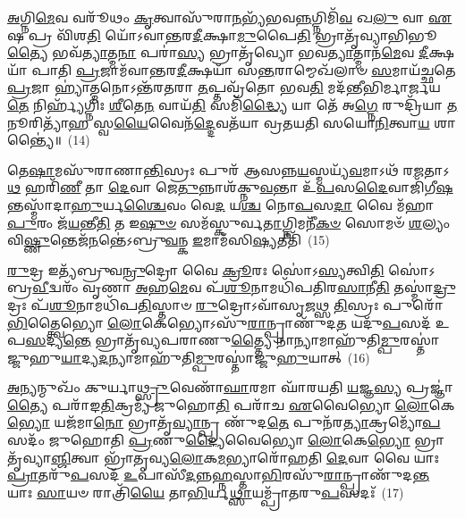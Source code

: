 \-\ul{𑌅}\-𑌗𑍍𑌨𑌿\-\ul{𑌮𑍇}\-𑌵 𑌵𑌰𑍂᳴𑌥𑌂 \ul{𑌕𑍃}\-𑌤𑍍𑌵𑌾𑌸𑍁᳴𑌰𑌾\-\ul{𑌨}\-𑌭𑍍𑌯᳴𑌭𑌵\-\ul{𑌨𑍍𑌨}\-𑌗𑍍𑌨𑌿𑌮𑌿᳴\-\ul{𑌵} 𑌖\-\ul{𑌲𑍁} 𑌵𑌾 \ul{𑌏}\-𑌷 𑌪𑍍𑌰 𑌵𑌿᳴𑌶\-\ul{𑌤𑌿} 𑌯𑍋᳴\-𑌽𑌵𑌾𑌨𑍍𑌤𑌰\-\ul{𑌦𑍀}\-𑌕𑍍𑌷𑌾\-\ul{𑌮𑍁}\-𑌪𑍈\-\ul{𑌤𑌿} 𑌭𑍍𑌰𑌾𑌤𑍃᳴𑌵𑍍𑌯𑌾𑌭𑌿𑌭𑍂\-\ul{𑌤𑍍𑌯𑍈} 𑌭𑌵᳴\-\ul{𑌤𑍍𑌯𑌾}\-𑌤𑍍𑌮\-\ul{𑌨𑌾} 𑌪𑌰𑌾॑\-\ul{𑌸𑍍𑌯} 𑌭𑍍𑌰𑌾𑌤𑍃᳴𑌵𑍍𑌯𑍋 𑌭𑌵\-\ul{𑌤𑍍𑌯𑌾}\-𑌤𑍍𑌮𑌾𑌨᳴\-\ul{𑌮𑍇}\-𑌵 \ul{𑌦𑍀}\-𑌕𑍍𑌷𑌯𑌾᳴ 𑌪𑌾𑌤𑌿 \ul{𑌪𑍍𑌰}\-𑌜𑌾𑌮᳴𑌵𑌾𑌨𑍍𑌤𑌰\-\ul{𑌦𑍀}\-𑌕𑍍𑌷𑌯𑌾᳴ 𑌸\-\ul{𑌨𑍍𑌤}\-𑌰𑌾𑌮𑍍𑌮𑍇𑌖᳴𑌲𑌾𑍞 \ul{𑌸}\-𑌮𑌾𑌯᳴𑌚𑍍𑌛𑌤𑍇 \ul{𑌪𑍍𑌰}\-𑌜𑌾 𑌹𑍍𑌯𑌾॑𑌤𑍍𑌮𑌨𑍋\-𑌽𑌨𑍍𑌤᳴𑌰𑌤𑌰𑌾 \ul{𑌤}\-𑌪𑍍𑌤𑌵𑍍𑌰᳴𑌤𑍋 𑌭𑌵\-\ul{𑌤𑌿} 𑌮𑌦᳴𑌨𑍍𑌤𑍀𑌭𑌿𑌰𑍍𑌮𑌾𑌰𑍍𑌜𑌯\-\ul{𑌤𑍇} 𑌨𑌿𑌰𑍍\mbox{}𑌹𑍍𑌯᳴𑌗𑍍𑌨𑌿𑌃 \ul{𑌶𑍀}\-𑌤𑍇\-\ul{𑌨} 𑌵𑌾𑌯᳴\-\ul{𑌤𑌿} 𑌸𑌮𑌿᳴\-\ul{𑌦𑍍𑌧𑍍𑌯𑍈} 𑌯𑌾 𑌤𑍇᳴ 𑌅\-\ul{𑌗𑍍𑌨𑍇} 𑌰𑍁𑌦𑍍𑌰𑌿᳴𑌯𑌾 \ul{𑌤}\-𑌨𑍂𑌰𑌿𑌤𑍍𑌯𑌾᳴\-\ul{𑌹} 𑌸𑍍𑌵\-\ul{𑌯𑍈}\-𑌵𑍈𑌨᳴\-\ul{𑌦𑍍𑌦𑍇}\-𑌵𑌤᳴𑌯𑌾 𑌵𑍍𑌰𑌤𑌯𑌤𑌿 𑌸𑌯𑍋\-\ul{𑌨𑌿}\-𑌤𑍍𑌵𑌾\-\ul{𑌯} 𑌶𑌾𑌨𑍍𑌤𑍍𑌯𑍈॑॥~(14)

{\anuvakamend[{𑌯𑍋 𑌵𑌾 𑌓𑌜᳴ 𑌆\-\ul{𑌹} 𑌯𑌦᳴\-\ul{𑌶𑍀}\-𑌯𑍇\-\ul{𑌤𑌿} 𑌤𑍇॑\-𑌽\-\ul{𑌗𑍍𑌨} 𑌏𑌕𑌾᳴\-𑌦𑌶 𑌚}]}%

𑌤𑍇\-\ul{𑌷𑌾}\-𑌮𑌸𑍁᳴𑌰𑌾𑌣𑌾\-\ul{𑌨𑍍𑌤𑌿}\-𑌸𑍍𑌰𑌃 𑌪𑍁𑌰᳴ 𑌆𑌸𑌨𑍍𑌨\-\ul{𑌯}\-𑌸𑍍𑌮𑌯𑍍𑌯᳴\-\ul{𑌵}\-𑌮𑌾\-𑌽𑌥᳴ 𑌰\-\ul{𑌜}\-𑌤𑌾\-𑌽\-\ul{𑌥} 𑌹𑌰𑌿᳴\-\ul{𑌣𑍀} 𑌤𑌾 \ul{𑌦𑍇}\-𑌵𑌾 𑌜𑍇\-\ul{𑌤𑍁}\-𑌨𑍍𑌨𑌾𑌶᳴𑌕𑍍𑌨𑍁\-\ul{𑌵}\-𑌨𑍍𑌤𑌾 𑌉᳴\-\ul{𑌪}\-𑌸\-\ul{𑌦𑍈}\-𑌵𑌾𑌜𑌿᳴𑌗𑍀\-\ul{𑌷}\-𑌨𑍍𑌤𑌸𑍍𑌮𑌾᳴𑌦𑌾\-\ul{𑌹𑍁}\-𑌰𑍍𑌯\-\ul{𑌶𑍍𑌚𑍈}\-𑌵𑌂 𑌵𑍇\-\ul{𑌦} 𑌯\-\ul{𑌶𑍍𑌚} 𑌨𑍋\-\ul{𑌪}\-𑌸\-\ul{𑌦𑌾} 𑌵𑍈 𑌮᳴𑌹𑌾\-\ul{𑌪𑍁}\-𑌰𑌂 𑌜᳴\-\ul{𑌯}\-𑌨𑍍𑌤𑍀\-\ul{𑌤𑌿} 𑌤 𑌇\-\ul{𑌷𑍁}\-\-\ul{𑍞} 𑌸𑌮᳴𑌸𑍍𑌕𑍁𑌰𑍍𑌵\-\ul{𑌤𑌾}\-𑌗𑍍𑌨𑌿𑌮𑌨𑍀᳴\-\ul{𑌕}\-\-\ul{𑍞} 𑌸𑍋𑌮𑍞᳴ \ul{𑌶}\-𑌲𑍍𑌯𑌂 𑌵𑌿\-\ul{𑌷𑍍𑌣𑍁}\-𑌨𑍍𑌤𑍇𑌜᳴\-\ul{𑌨}\-𑌨𑍍𑌤𑍇॑\-𑌽𑌬𑍍𑌰𑍁\-\ul{𑌵}\-𑌨𑍍𑌕 \ul{𑌇}\-𑌮𑌾𑌮᳴𑌸𑌿\-\ul{𑌷𑍍𑌯}\-𑌤𑍀𑌤𑌿᳴~(15)

\-\ul{𑌰𑍁}\-𑌦𑍍𑌰 𑌇𑌤𑍍𑌯᳴𑌬𑍍𑌰𑍁𑌵\-\ul{𑌨𑍍𑌰𑍁}\-𑌦𑍍𑌰𑍋 𑌵𑍈 \ul{𑌕𑍍𑌰𑍂}\-𑌰𑌃 𑌸𑍋॑\-𑌽\-\ul{𑌸𑍍𑌯}\-𑌤𑍍𑌵𑌿\-\ul{𑌤𑌿} 𑌸𑍋॑\-𑌽𑌬𑍍𑌰\-\ul{𑌵𑍀}\-𑌦𑍍𑌵𑌰𑌂᳴ 𑌵𑍃𑌣𑌾 \ul{𑌅}\-𑌹\-\ul{𑌮𑍇}\-𑌵 𑌪᳴\-\ul{𑌶𑍂}\-𑌨𑌾𑌮𑌧𑌿᳴𑌪𑌤𑌿𑌰\-\ul{𑌸𑌾}\-𑌨𑍀\-\ul{𑌤𑌿} 𑌤𑌸𑍍𑌮𑌾॑\-\ul{𑌦𑍍𑌰𑍁}\-𑌦𑍍𑌰𑌃 𑌪᳴\-\ul{𑌶𑍂}\-𑌨𑌾𑌮𑌧𑌿᳴𑌪\-\ul{𑌤𑌿}\-𑌸𑍍𑌤𑌾𑍞 \ul{𑌰𑍁}\-𑌦𑍍𑌰𑍋\-𑌽𑌵𑌾᳴𑌸𑍃\-\ul{𑌜}\-𑌥𑍍𑌸 \ul{𑌤𑌿}\-𑌸𑍍𑌰𑌃 𑌪𑍁𑌰𑍋᳴ \ul{𑌭𑌿}\-𑌤𑍍𑌤𑍍𑌵𑍈𑌭𑍍𑌯𑍋 \ul{𑌲𑍋}\-𑌕𑍇𑌭𑍍𑌯𑍋\-𑌽𑌸𑍁᳴\-\ul{𑌰𑌾}\-𑌨𑍍𑌪𑍍𑌰𑌾𑌣𑍁᳴𑌦\-\ul{𑌤} 𑌯𑌦𑍁᳴\-\ul{𑌪}\-𑌸𑌦᳴ 𑌉𑌪\-\ul{𑌸}\-𑌦𑍍𑌯\-\ul{𑌨𑍍𑌤𑍇} 𑌭𑍍𑌰𑌾𑌤𑍃᳴𑌵𑍍𑌯𑌪𑌰𑌾𑌣𑍁\-\ul{𑌤𑍍𑌤𑍍𑌯𑍈} 𑌨𑌾𑌨𑍍𑌯𑌾𑌮𑌾𑌹𑍁᳴𑌤𑌿\-\ul{𑌮𑍍𑌪𑍁}\-𑌰𑌸𑍍𑌤𑌾॑𑌜𑍍𑌜𑍁𑌹𑍁\-\ul{𑌯𑌾}\-𑌦𑍍𑌯\-\ul{𑌦}\-𑌨𑍍𑌯𑌾𑌮𑌾𑌹𑍁᳴𑌤𑌿\-\ul{𑌮𑍍𑌪𑍁}\-𑌰𑌸𑍍𑌤𑌾॑𑌜𑍍𑌜𑍁\-\ul{𑌹𑍁}\-𑌯𑌾𑌤𑍍~(16)

\-\ul{𑌅}\-𑌨𑍍𑌯𑌨𑍍𑌮𑍁𑌖𑌂᳴ 𑌕𑍁𑌰𑍍𑌯𑌾\-\ul{𑌥𑍍𑌸𑍍𑌰𑍁}\-𑌵𑍇𑌣𑌾᳴\-\ul{𑌘𑌾}\-𑌰𑌮𑌾 𑌘𑌾᳴𑌰𑌯𑌤𑌿 \ul{𑌯}\-𑌜𑍍𑌞\-\ul{𑌸𑍍𑌯} 𑌪𑍍𑌰𑌜𑍍𑌞𑌾॑\-\ul{𑌤𑍍𑌯𑍈} 𑌪𑌰𑌾᳴𑌙\-\ul{𑌤𑌿}\-𑌕𑍍𑌰𑌮𑍍𑌯᳴ 𑌜𑍁𑌹𑍋\-\ul{𑌤𑌿} 𑌪𑌰𑌾᳴𑌚 \ul{𑌏}\-𑌵𑍈𑌭𑍍𑌯𑍋 \ul{𑌲𑍋}\-𑌕𑍇\-\ul{𑌭𑍍𑌯𑍋} 𑌯𑌜᳴𑌮𑌾\-\ul{𑌨𑍋} 𑌭𑍍𑌰𑌾𑌤𑍃᳴\-\ul{𑌵𑍍𑌯𑌾}\-𑌨𑍍𑌪𑍍𑌰 𑌣𑍁᳴𑌦\-\ul{𑌤𑍇} 𑌪𑍁𑌨᳴𑌰\-\ul{𑌤𑍍𑌯𑌾}\-𑌕𑍍𑌰𑌮𑍍𑌯𑍋᳴\-\ul{𑌪}\-𑌸𑌦𑌂᳴ 𑌜𑍁𑌹𑍋𑌤𑌿 \ul{𑌪𑍍𑌰}\-𑌣𑍁\-\ul{𑌦𑍍𑌯𑍈}\-𑌵𑍈𑌭𑍍𑌯𑍋 \ul{𑌲𑍋}\-𑌕𑍇\-\ul{𑌭𑍍𑌯𑍋} 𑌭𑍍𑌰𑌾𑌤𑍃᳴𑌵𑍍𑌯𑌾\-\ul{𑌞𑍍𑌜𑌿}\-𑌤𑍍𑌵𑌾 𑌭𑍍𑌰𑌾᳴𑌤𑍃𑌵𑍍𑌯\-\ul{𑌲𑍋}\-𑌕\-\ul{𑌮}\-𑌭𑍍𑌯𑌾𑌰𑍋᳴𑌹𑌤𑌿 \ul{𑌦𑍇}\-𑌵𑌾 𑌵𑍈 𑌯𑌾𑌃 \ul{𑌪𑍍𑌰𑌾}\-𑌤𑌰𑍁᳴\-\ul{𑌪}\-𑌸𑌦᳴ \ul{𑌉}\-𑌪𑌾𑌸𑍀᳴\-\ul{𑌦}\-𑌨𑍍𑌨\-\ul{𑌹𑍍𑌨}\-𑌸𑍍𑌤𑌾\-\ul{𑌭𑌿}\-𑌰𑌸𑍁᳴\-\ul{𑌰𑌾}\-𑌨𑍍𑌪𑍍𑌰𑌾𑌣𑍁᳴𑌦\-\ul{𑌨𑍍𑌤} 𑌯𑌾𑌃 \ul{𑌸𑌾}\-𑌯𑍞 𑌰𑌾𑌤𑍍𑌰𑌿᳴\-\ul{𑌯𑍈} 𑌤𑌾\-\ul{𑌭𑌿}\-𑌰𑍍𑌯\-\ul{𑌥𑍍𑌸𑌾}\-𑌯𑌮𑍍𑌪𑍍𑌰𑌾᳴𑌤𑌰𑍁\-\ul{𑌪}\-𑌸𑌦𑌃᳴~(17)

